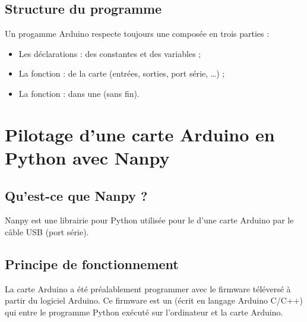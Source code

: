 \documentclass[a4paper,10pt,french]{book}
\begin{document}
\subsection{Structure du programme}
\label{\detokenize{2_arduino/5_particularite_langage:structure-du-programme}}
Un progamme Arduino respecte toujours une  composée en trois parties :
\begin{itemize}
\item {} 
Les déclarations :  des constantes et des variables ;

\item {} 
La fonction  :  de la carte (entrées, sorties, port série, …) ;

\item {} 
La fonction  :  dans une  (sans fin).

\end{itemize}


\section{Pilotage d’une carte Arduino en Python avec Nanpy}
\label{\detokenize{2_arduino/6_nanpy:pilotage-d-une-carte-arduino-en-python-avec-nanpy}}\label{\detokenize{2_arduino/6_nanpy::doc}}

\subsection{Qu’est-ce que Nanpy ?}
\label{\detokenize{2_arduino/6_nanpy:qu-est-ce-que-nanpy}}
Nanpy est une librairie pour Python utilisée pour le  d’une carte Arduino par le câble USB (port série).



\subsection{Principe de fonctionnement}
\label{\detokenize{2_arduino/6_nanpy:principe-de-fonctionnement}}
La carte Arduino a été préalablement programmer avec le firmware  téléversé à partir du logiciel Arduino. Ce firmware est un  (écrit en langage Arduino C/C++) qui  entre le programme Python exécuté sur l’ordinateur et la carte Arduino.
\end{document}
